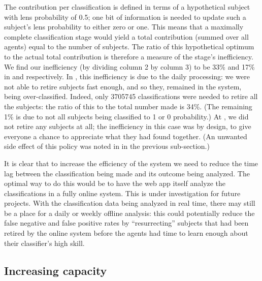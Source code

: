 \documentclass[useAMS,usenatbib,a4paper]{mn2e}
\begin{document}
The contribution per classification is defined in terms of a hypothetical
subject with lens probability of 0.5; one bit of information is needed to
update such a subject's lens probability to either zero or one. This means
that a maximally complete classification stage would yield a total
contribution (summed over all agents) equal to the number of subjects. The
ratio of this hypothetical optimum to the actual total contribution is
therefore a measure of the stage's inefficiency. We find our inefficiency (by
dividing column 2 by column 3) to be 33\% and 17\% in \StageOne and \StageTwo
respectively. In \StageOne, this inefficiency is due to the daily processing: we
were not able to retire subjects fast enough, and so they, remained in the
system, being over-classified. Indeed, only 3705745 classifications were
needed to retire all the subjects: the ratio of this to the total number made
is 34\%. (The remaining 1\% is due to not all subjects being classified to 1
or 0 probability.) At \StageTwo, we did not retire any subjects at all; the
inefficiency in this case was by design, to give everyone a chance to
appreciate what they had found together. (An unwanted side effect of this
policy was noted in  in the
previous sub-section.)

It is clear that to increase the efficiency of the system we need to reduce
the time lag between the classification being made and its outcome being
analyzed. The optimal way to do this would be to have the web app itself
analyze the classifications in a fully online system. This is under
investigation for future projects. With the classification data being analyzed
in real time, there may still be a place for a daily or weekly offline
analysis: this could potentially reduce the false negative and false positive
rates by ``resurrecting'' subjects that had been retired by the online system
before the agents had time to learn enough about their classifier's high
skill.



\subsection{Increasing capacity}
\label{sec:discuss:capacity}
\end{document}
